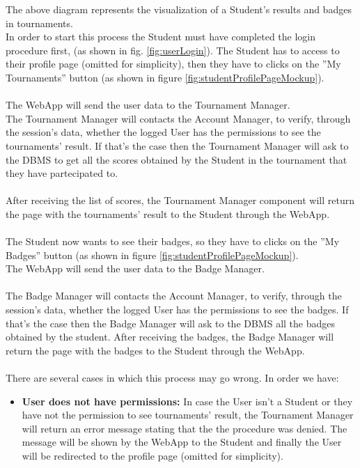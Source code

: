 \documentclass{article}
\begin{document}
{        The above diagram represents the visualization of a Student's results and badges
        in tournaments. \\
        In order to start this process the Student must have 
        completed the login procedure first, (as shown in fig. \ref{fig:userLogin}).
        The Student has to access to their profile page (omitted for simplicity), 
        then they have to clicks on the ”My Tournaments” button (as shown in figure \ref{fig:studentProfilePageMockup}).
        \\ \\
        The WebApp will send the user data to the Tournament Manager.\\
        The Tournament Manager will contacts the Account Manager, to verify, 
        through the session’s data, whether the logged User has the 
        permissions to see the tournaments' result. If that’s the case then 
        the Tournament Manager will ask to the DBMS to get all the scores 
        obtained by the Student in the tournament that they have partecipated to.
        \\ \\
        After receiving the list of scores, the Tournament Manager component will 
        return the page with the tournaments' result to the Student through 
        the WebApp.
        \\ \\
        The Student now wants to see their badges, so they have to
        clicks on the ”My Badges” button (as shown in figure \ref{fig:studentProfilePageMockup}).\\
        The WebApp will send the user data to the Badge Manager.
        \\ \\
        The Badge Manager will contacts the Account Manager, to verify, 
        through the session’s data, whether the logged User has the 
        permissions to see the badges. If that’s the case then 
        the Badge Manager will ask to the DBMS all the badges obtained by
        the student. After receiving the badges, the Badge Manager will 
        return the page with the badges to the Student through the WebApp. 
        \\ \\
        There are several cases in which this process may go wrong. In order we have:
        \begin{itemize}
            \item \textbf{User does not have permissions:} In case the User isn't a Student or
            they have not the permission to see tournaments' result, the Tournament Manager 
            will return an error message stating that the the procedure was denied. 
            The message will be shown by the WebApp to the Student and finally the User will be
            redirected to the profile page (omitted for simplicity).
        \end{itemize}

}
\end{document}
